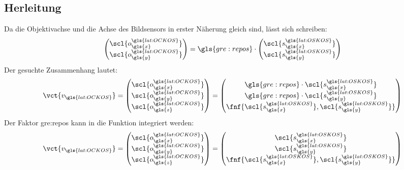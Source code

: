 \subsection{Herleitung}
Da die Objektivachse und die Achse des Bildsensors in erster Näherung gleich sind, lässt sich schreiben:
\begin{equation}
\begin{pmatrix}
\scl{o^{\gls{lat:OCKOS}}_{\gls{x}}} \\ \scl{o^{\gls{lat:OCKOS}}_{\gls{y}}}
\end{pmatrix}
= \gls{gre:repos} \cdot
\begin{pmatrix}
\scl{s^{\gls{lat:OSKOS}}_{\gls{x}}} \\ \scl{s^{\gls{lat:OSKOS}}_{\gls{y}}}
\end{pmatrix}
\end{equation}
Der gesuchte Zusammenhang lautet: 
\begin{equation}
\vct{v_{\gls{lat:OCKOS}}} =
\begin{pmatrix}
\scl{o^{\gls{lat:OCKOS}}_{\gls{x}}} \\ \scl{o^{\gls{lat:OCKOS}}_{\gls{y}}} \\ \scl{o^{\gls{lat:OCKOS}}_{\gls{z}}}
\end{pmatrix}
=
\begin{pmatrix}
\gls{gre:repos} \cdot \scl{s^{\gls{lat:OSKOS}}_{\gls{x}}} \\  \gls{gre:repos} \cdot \scl{s^{\gls{lat:OSKOS}}_{\gls{y}}} \\ \fnf{\scl{s^{\gls{lat:OSKOS}}_{\gls{x}}},\scl{s^{\gls{lat:OSKOS}}_{\gls{y}}}}
\end{pmatrix}
\end{equation}
Der Faktor  \gls{gre:repos} kann in die Funktion  integriert werden:
\begin{equation}
\label{eq:ocamcalibuv}
\vct{v_{\gls{lat:OCKOS}}} =
\begin{pmatrix}
\scl{o^{\gls{lat:OCKOS}}_{\gls{x}}} \\ \scl{o^{\gls{lat:OCKOS}}_{\gls{y}}} \\ \scl{o^{\gls{lat:OCKOS}}_{\gls{z}}}
\end{pmatrix}
=
\begin{pmatrix}
\scl{s^{\gls{lat:OSKOS}}_{\gls{x}}} \\ \scl{s^{\gls{lat:OSKOS}}_{\gls{y}}} \\ \fnf{\scl{s^{\gls{lat:OSKOS}}_{\gls{x}}},\scl{s^{\gls{lat:OSKOS}}_{\gls{y}}}}
\end{pmatrix}
\end{equation}
